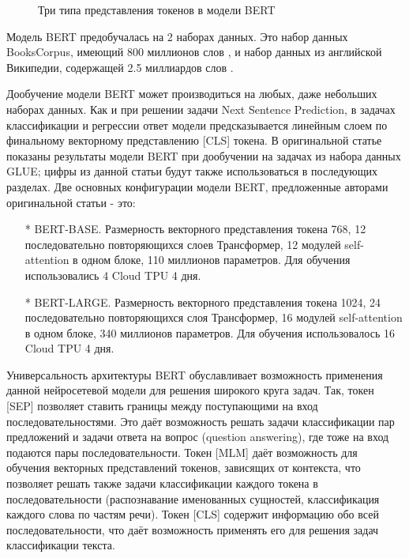 \begin{figure}[ht]
  \caption{Три типа представления токенов в модели BERT}\label{fig:Transformer5-BERTTokenTypes}
\end{figure}
Модель BERT предобучалась на 2 наборах данных. Это набор данных BooksCorpus, имеющий 800 миллионов слов \cite{zhu_2015}, и набор данных из английской Википедии, содержащей 2.5 миллиардов слов \cite{devlin_2018}. 

Дообучение модели BERT может производиться на любых, даже небольших наборах данных. Как и при решении задачи Next Sentence Prediction, в задачах классификации и регрессии ответ модели предсказывается линейным слоем по финальному векторному представлению [CLS] токена. В оригинальной статье показаны результаты модели BERT при дообучении на задачах из набора данных GLUE; цифры из данной статьи будут также использоваться в последующих разделах. 
Две основных конфигурации модели BERT, предложенные авторами оригинальной статьи - это:
\begin{itemize}
\item[*] BERT-BASE. Размерность векторного представления токена 768, 12 последовательно повторяющихся слоев Трансформер, 12 модулей self-attention в одном блоке, 110 миллионов параметров. Для обучения использовались 4 Cloud TPU 4 дня. 
\item[*] BERT-LARGE. Размерность векторного представления токена 1024, 24 последовательно повторяющихся слоя Трансформер, 16 модулей self-attention в одном блоке, 340 миллионов параметров. Для обучения использовалось 16 Cloud TPU 4 дня. 
\end{itemize}

Универсальность архитектуры BERT обуславливает возможность применения данной нейросетевой модели для решения широкого круга задач. Так, токен [SEP] позволяет ставить границы между поступающими на вход последовательностями. Это даёт возможность решать задачи классификации пар предложений и задачи ответа на вопрос (question answering), где тоже на вход подаются пары последовательности. Токен [MLM] даёт возможность для обучения векторных представлений токенов, зависящих от контекста, что позволяет решать также задачи классификации каждого токена в последовательности (распознавание именованных сущностей, классификация каждого слова по частям речи). Токен [CLS] содержит информацию обо всей последовательности, что даёт возможность применять его для решения задач классификации текста. 

